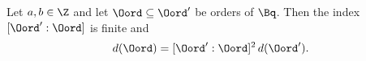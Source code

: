 Let $a,b\in\Z$ and let $\Oord\subseteq\Oord'$ be orders of $\Bq$. Then the index $[\Oord':\Oord]$ is finite and
\[
  d(\Oord)=[\Oord':\Oord]^2\,d(\Oord').
\]
